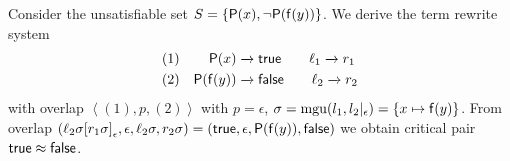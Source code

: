 \begin{example}
	Consider the unsatisfiable set \( S = \{ \mathsf{P}(x), \lnot \mathsf{P}(\mathsf{f}(y)) \} \).
	We derive the term rewrite system
	\begin{align*}
	(1)&&
		\mP(x) &\rwStep \mathsf{true}
		\tag*{\( \ell_1 \rwStep r_1 \)}
		\\
	(2)&&
		\mP(\mf(y)) &\rwStep \mathsf{false}
		\tag*{\( \ell_2 \rwStep r_2 \)}
	\end{align*}
	with overlap \( \left<(1),p,(2)\right> \) with \( p=\epsilon \),
	\( \sigma = \operatorname{mgu}(l_1, l_2|_\epsilon) = \{ x\mapsto \mathsf{f}(y)\} \).
	From overlap
	\(
		\left(\ell_2\sigma{[r_1\sigma]}_\epsilon, \epsilon, \ell_2\sigma, r_2\sigma\right)
		= (\mathsf{true}, \epsilon, \mathsf{P}(\mathsf{f}(y)), \mathsf{false})
	\)
	we obtain critical pair \( \mathsf{true} \approx \mathsf{false} \).

\end{example}




